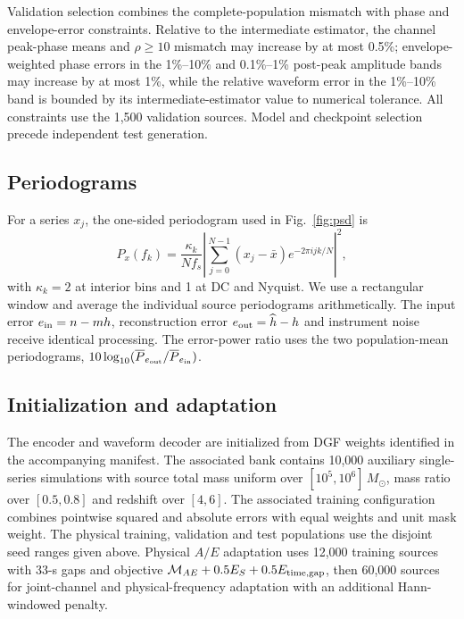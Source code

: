 \documentclass[10pt,prd,aps,a4paper,twocolumn,superscriptaddress,nofootinbib,floatfix]{revtex4-2}
\begin{document}
Validation selection combines the complete-population mismatch with phase and envelope-error constraints. Relative to the intermediate estimator, the channel peak-phase means and $\rho\ge10$ mismatch may increase by at most 0.5\%; envelope-weighted phase errors in the 1\%--10\% and 0.1\%--1\% post-peak amplitude bands may increase by at most 1\%, while the relative waveform error in the 1\%--10\% band is bounded by its intermediate-estimator value to numerical tolerance. All constraints use the 1,500 validation sources. Model and checkpoint selection precede independent test generation.

\subsection{Periodograms}
For a series $x_j$, the one-sided periodogram used in Fig.~\ref{fig:psd} is
\begin{equation}
P_x(f_k)=\frac{\kappa_k}{Nf_s}\left|\sum_{j=0}^{N-1}(x_j-\bar x)e^{-2\pi i jk/N}\right|^2,
\end{equation}
with $\kappa_k=2$ at interior bins and 1 at DC and Nyquist. We use a rectangular window and average the individual source periodograms arithmetically. The input error $e_{\rm in}=n-mh$, reconstruction error $e_{\rm out}=\widehat h-h$ and instrument noise receive identical processing. The error-power ratio uses the two population-mean periodograms, $10\log_{10}(\overline P_{e_{\rm out}}/\overline P_{e_{\rm in}})$.

\subsection{Initialization and adaptation}\label{app:initialization}
The encoder and waveform decoder are initialized from DGF weights identified in the accompanying manifest. The associated bank contains 10,000 auxiliary single-series simulations with source total mass uniform over $[10^5,10^6]\,M_\odot$, mass ratio over $[0.5,0.8]$ and redshift over $[4,6]$. The associated training configuration combines pointwise squared and absolute errors with equal weights and unit mask weight. The physical training, validation and test populations use the disjoint seed ranges given above. Physical $A/E$ adaptation uses 12,000 training sources with 33-s gaps and objective $\mathcal M_{AE}+0.5E_S+0.5E_{\rm time,gap}$, then 60,000 sources for joint-channel and physical-frequency adaptation with an additional Hann-windowed penalty.
\end{document}
